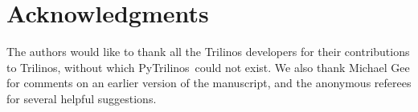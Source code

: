 \documentclass[acmtocl]{acmtrans2m}
\newcommand{\PyTrilinos}{{PyTrilinos}}
\begin{document}
\bigskip

\section*{Acknowledgments}
\label{sec:acks}

The authors would like to thank all the Trilinos developers for their
contributions to Trilinos, without which \PyTrilinos\ could not exist.
We also thank Michael Gee for comments on an earlier version of the
manuscript, and the anonymous referees for several helpful suggestions.



\end{document}

